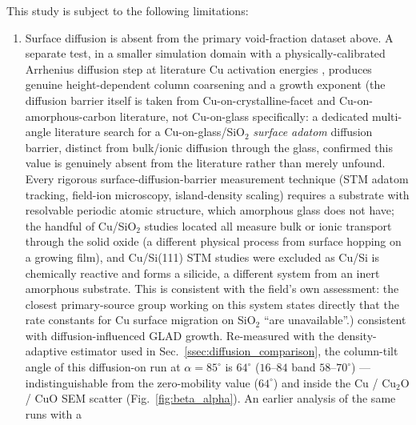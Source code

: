 \documentclass[aip,amsmath,amssymb,reprint]{revtex4-1}
\newcommand{\dang}{\ensuremath{\alpha}}
\begin{document}
This study is subject to the following limitations:
\begin{enumerate}
  \item Surface diffusion is absent from the primary void-fraction
    dataset above. A separate test, in a smaller simulation domain with
    a physically-calibrated Arrhenius diffusion step at literature Cu
    activation energies \citep{jamnig2019,boisvert1997cu}, produces
    genuine height-dependent column coarsening and a growth exponent
    (the diffusion barrier itself is taken from Cu-on-crystalline-facet and
    Cu-on-amorphous-carbon literature, not Cu-on-glass specifically: a
    dedicated multi-angle literature search for a Cu-on-glass/SiO$_2$
    \emph{surface adatom} diffusion barrier, distinct from bulk/ionic
    diffusion through the glass, confirmed this value is genuinely absent
    from the literature rather than merely unfound. Every rigorous
    surface-diffusion-barrier measurement technique (STM adatom tracking,
    field-ion microscopy, island-density scaling) requires a substrate with
    resolvable periodic atomic structure, which amorphous glass does not
    have; the handful of Cu/SiO$_2$ studies located all measure bulk or
    ionic transport through the solid oxide (a different physical process
    from surface hopping on a growing film), and Cu/Si(111) STM studies were
    excluded as Cu/Si is chemically reactive and forms a silicide, a
    different system from an inert amorphous substrate. This is consistent
    with the field's own assessment: the closest primary-source group
    working on this system states directly that the rate constants for Cu
    surface migration on SiO$_2$ ``are unavailable''.)
    consistent with diffusion-influenced GLAD growth.
    Re-measured with the density-adaptive estimator used in
    Sec.~\ref{ssec:diffusion_comparison}, the column-tilt angle of this
    diffusion-on run at $\dang=85^{\circ}$ is $64^{\circ}$ ($16$--$84$ band
    $58$--$70^{\circ}$) --- indistinguishable from the zero-mobility value
    ($64^{\circ}$) and inside the Cu / Cu$_2$O / CuO SEM scatter
    (Fig.~\ref{fig:beta_alpha}). An earlier analysis of the same runs with a

\end{enumerate}
\end{document}
